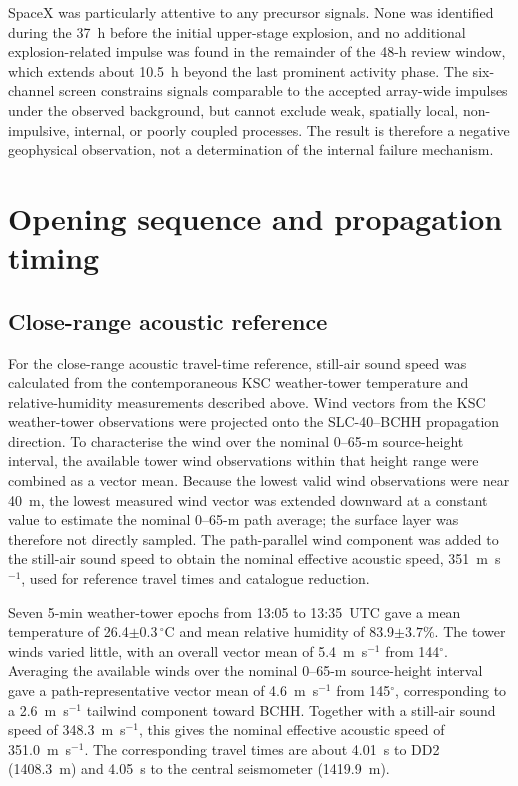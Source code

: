 \documentclass[]{seismica}
\begin{document}
SpaceX was particularly attentive to any precursor signals. None was
identified during the 37~h before the initial upper-stage explosion, and no
additional explosion-related impulse was found in the remainder of the 48-h
review window, which extends about 10.5~h beyond the last prominent activity
phase. The six-channel screen constrains signals comparable to the accepted
array-wide impulses under the observed background, but cannot exclude weak,
spatially local, non-impulsive, internal, or poorly coupled processes. The
result is therefore a negative geophysical observation, not a determination
of the internal failure mechanism.


\section{Opening sequence and propagation timing}
\label{sec:opening_timing}

\subsection{Close-range acoustic reference}

For the close-range acoustic travel-time reference, still-air sound speed was
calculated from the contemporaneous KSC weather-tower temperature and
relative-humidity measurements described above. Wind vectors from the KSC 
weather-tower observations were projected onto the SLC-40--BCHH propagation 
direction. To characterise the wind
over the nominal 0--65-m source-height interval, the available tower wind
observations within that height range were combined as a vector mean. Because
the lowest valid wind observations were near 40~m, the lowest measured wind
vector was extended downward at a constant value to estimate the nominal
0--65-m path average; the surface layer was therefore not directly sampled.
The path-parallel wind component was added to the still-air sound speed to
obtain the nominal effective acoustic speed, 351~m~s$^{-1}$, used for
reference travel times and catalogue reduction.

Seven 5-min weather-tower epochs from 13:05 to 13:35~UTC gave a mean
temperature of 26.4$\pm0.3\,^{\circ}$C and mean relative humidity of
83.9$\pm3.7\%$. The tower winds varied little, with an overall vector mean of
5.4~m~s$^{-1}$ from 144$^\circ$. Averaging the available winds over the
nominal 0--65-m source-height interval gave a path-representative vector mean
of 4.6~m~s$^{-1}$ from 145$^\circ$, corresponding to a 2.6~m~s$^{-1}$
tailwind component toward BCHH. Together with a still-air sound speed of
348.3~m~s$^{-1}$, this gives the nominal effective acoustic speed of
351.0~m~s$^{-1}$. The corresponding travel times are about 4.01~s to DD2
(1408.3~m) and 4.05~s to the central seismometer (1419.9~m).
\end{document}
